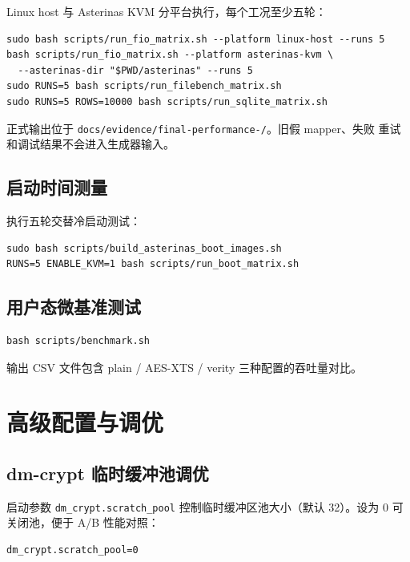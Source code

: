 Linux host 与 Asterinas KVM 分平台执行，每个工况至少五轮：
\begin{lstlisting}[basicstyle=\ttfamily\small, breaklines=true]
sudo bash scripts/run_fio_matrix.sh --platform linux-host --runs 5
bash scripts/run_fio_matrix.sh --platform asterinas-kvm \
  --asterinas-dir "$PWD/asterinas" --runs 5
sudo RUNS=5 bash scripts/run_filebench_matrix.sh
sudo RUNS=5 ROWS=10000 bash scripts/run_sqlite_matrix.sh
\end{lstlisting}

正式输出位于 \texttt{docs/\allowbreak evidence/\allowbreak final-\allowbreak performance-/}。旧假 mapper、失败
重试和调试结果不会进入生成器输入。

\subsection{启动时间测量}

执行五轮交替冷启动测试：
\begin{lstlisting}[basicstyle=\ttfamily\small, breaklines=true]
sudo bash scripts/build_asterinas_boot_images.sh
RUNS=5 ENABLE_KVM=1 bash scripts/run_boot_matrix.sh
\end{lstlisting}

\subsection{用户态微基准测试}

\begin{lstlisting}[basicstyle=\ttfamily\small, breaklines=true]
bash scripts/benchmark.sh
\end{lstlisting}

输出 CSV 文件包含 plain / AES-XTS / verity 三种配置的吞吐量对比。

\section{高级配置与调优}

\subsection{dm-crypt 临时缓冲池调优}

启动参数 \texttt{dm\_\allowbreak crypt.scratch\_\allowbreak pool} 控制临时缓冲区池大小（默认 32）。设为 0 可关闭池，便于 A/B 性能对照：
\begin{lstlisting}[basicstyle=\ttfamily\small, breaklines=true]
dm_crypt.scratch_pool=0
\end{lstlisting}


